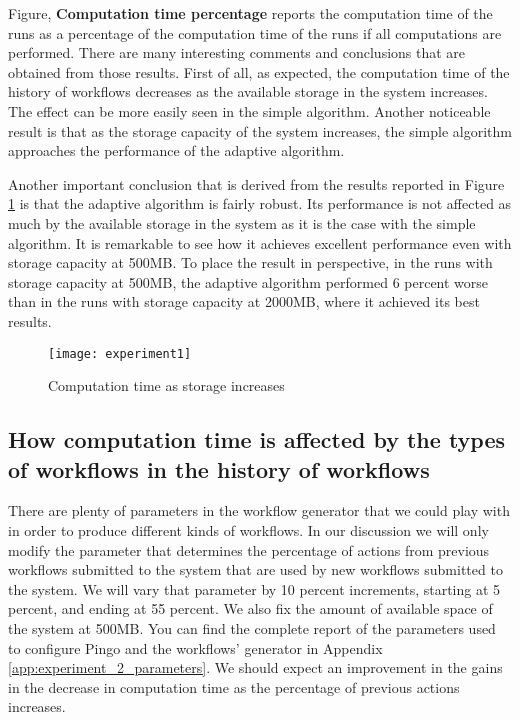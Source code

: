 Figure, \textbf{Computation time percentage} reports the computation time of the runs as a percentage of the computation time of the runs if all computations are performed. There are many interesting comments and conclusions that are obtained from those results. First of all, as expected, the computation time of the history of workflows decreases as the available storage in the system increases.  The effect can be more easily seen in the simple algorithm.  Another noticeable result is that as the storage capacity of the system increases, the simple algorithm approaches the performance of the adaptive algorithm.

Another important conclusion that is derived from the results reported in Figure \ref{fig:experiment1} is that the adaptive algorithm is fairly robust. Its performance is not affected as much by the available storage in the system as it is the case with the simple algorithm. It is remarkable to see how it achieves excellent performance even with storage capacity at 500MB.  To place the result in perspective, in the runs with storage capacity at 500MB, the adaptive algorithm performed 6 percent worse than in the runs with storage capacity at 2000MB, where it achieved its best results.


\begin{figure}
\centering
\texttt{[image: experiment1]}
\caption{Computation time as storage increases}
\label{fig:experiment1}
\end{figure}

\subsection{How computation time is affected by the types of workflows in the history of workflows}
There are plenty of parameters in the workflow generator that we could play with in order to produce different kinds of workflows.  In our discussion we will only modify the parameter that determines the percentage of actions from previous workflows submitted to the system that are used by new workflows submitted to the system.  We will vary that parameter by 10 percent increments, starting at 5 percent, and ending at 55 percent.  We also fix the amount of available space of the system at 500MB.  You can find the complete report of the parameters used to configure Pingo and the workflows' generator in Appendix \ref{app:experiment_2_parameters}. We should expect an improvement in the gains in the decrease in computation time as the percentage of previous actions increases.

